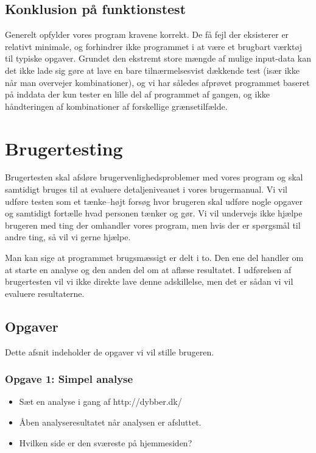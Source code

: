 \documentclass[a4paper,oneside]{memoir}
\begin{document}
\subsection{Konklusion på funktionstest}

Generelt opfylder vores program kravene korrekt. De få fejl der
eksisterer er relativt minimale, og forhindrer ikke programmet i at
være et brugbart værktøj til typiske opgaver. Grundet den ekstremt
store mængde af mulige input-data kan det ikke lade sig gøre at lave
en bare tilnærmelsesvist dækkende test (især ikke når man overvejer
kombinationer), og vi har således afprøvet programmet baseret på
inddata der kun tester en lille del af programmet af gangen, og ikke
håndteringen af kombinationer af forskellige grænsetilfælde.

\section{Brugertesting}
\label{brugertesting}
Brugertesten skal afsløre brugervenlighedsproblemer med vores program
og skal samtidigt bruges til at evaluere detaljeniveauet i vores
brugermanual. Vi vil udføre testen som et tænke--højt forsøg hvor
brugeren skal udføre nogle opgaver og samtidigt fortælle hvad personen
tænker og gør. Vi vil undervejs ikke hjælpe brugeren med ting der
omhandler vores program, men hvis der er spørgsmål til andre ting, så
vil vi gerne hjælpe.

Man kan sige at programmet brugsmæssigt er delt i to. Den ene del
handler om at starte en analyse og den anden del om at aflæse
resultatet. I udførelsen af brugertesten vil vi ikke direkte lave
denne adskillelse, men det er sådan vi vil evaluere resultaterne.

\subsection{Opgaver}
Dette afsnit indeholder de opgaver vi vil stille brugeren.

\subsubsection{Opgave 1: Simpel analyse}
\begin{itemize}
\item Sæt en analyse i gang af http://dybber.dk/
\item Åben analyseresultatet når analysen er afsluttet.
\item Hvilken side er den sværeste på hjemmesiden?
\end{itemize}
\end{document}

